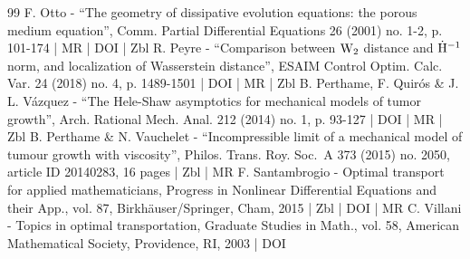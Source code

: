 \begin{thebibliography}{99}
F. Otto - “The geometry of dissipative evolution equations: the porous medium equation”, Comm. Partial Differential Equations 26 (2001) no. 1-2, p. 101-174 | MR | DOI | Zbl
R. Peyre - “Comparison between $\rm W_2$ distance and $\dot{\rm H}^{-1}$ norm, and localization of Wasserstein distance”, ESAIM Control Optim. Calc. Var. 24 (2018) no. 4, p. 1489-1501 | DOI | MR | Zbl
B. Perthame, F. Quirós \& J. L. Vázquez - “The Hele-Shaw asymptotics for mechanical models of tumor growth”, Arch. Rational Mech. Anal. 212 (2014) no. 1, p. 93-127 | DOI | MR | Zbl
B. Perthame \& N. Vauchelet - “Incompressible limit of a mechanical model of tumour growth with viscosity”, Philos. Trans. Roy. Soc. A 373 (2015) no. 2050, article ID 20140283, 16 pages | Zbl | MR
F. Santambrogio - Optimal transport for applied mathematicians, Progress in Nonlinear Differential Equations and their App., vol. 87, Birkhäuser/Springer, Cham, 2015 | Zbl | DOI | MR
C. Villani - Topics in optimal transportation, Graduate Studies in Math., vol. 58, American Mathematical Society, Providence, RI, 2003 | DOI
\end{thebibliography}
